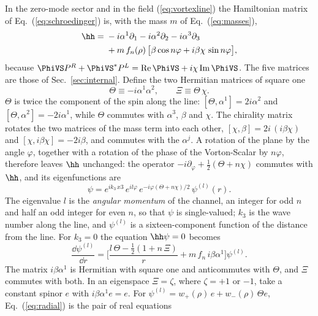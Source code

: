 In the zero-mode sector and in the field (\ref{eq:vortexline}) the Hamiltonian matrix of
Eq.~(\ref{eq:schroedinger}) is, with the mass $m$ of Eq.~(\ref{eq:masses}),
\begin{align}
\hh={}&-i\alpha^1\partial_1-i\alpha^2\partial_2-i\alpha^3\partial_3\nonumber\\
&+m\,f_n(\rho)\,\big[\beta\cos n\varphi+i\beta\chi\,\sin n\varphi\big],
\label{eq:hline}
\end{align}
because $\PhiVS P^{R}+\PhiVS^{*}P^{L}=\mathrm{Re}\,\PhiVS+i\chi\,\mathrm{Im}\,\PhiVS$. The five
matrices are those of Sec.~\ref{sec:internal}. Define the two Hermitian matrices of square one
\begin{equation}
\Theta\equiv-i\alpha^1\alpha^2,\qquad\Xi\equiv\Theta\,\chi .
\label{eq:ThetaXi}
\end{equation}
$\Theta$ is twice the component of the spin along the line: $[\Theta,\alpha^1]=2i\alpha^2$ and
$[\Theta,\alpha^2]=-2i\alpha^1$, while $\Theta$ commutes with $\alpha^3$, $\beta$ and $\chi$. The
chirality matrix rotates the two matrices of the mass term into each other,
$[\chi,\beta]=2i\,(i\beta\chi)$ and $[\chi,i\beta\chi]=-2i\beta$, and commutes with the $\alpha^j$.
A rotation of the plane by the angle $\varphi$, together with a rotation of the phase of the
Vorton-Scalar by $n\varphi$, therefore leaves $\hh$ unchanged: the operator
$-i\partial_\varphi+\tfrac12(\Theta+n\chi)$ commutes with $\hh$, and its eigenfunctions are
\begin{equation}
\psi=e^{ik_3\,x3}\,e^{il\varphi}\,e^{-i\varphi(\Theta+n\chi)/2}\,\psi^{(l)}(r).
\label{eq:channel}
\end{equation}
The eigenvalue $l$ is the \emph{angular momentum} of the channel, an integer for odd $n$ and half
an odd integer for even $n$, so that $\psi$ is single-valued; $k_3$ is the wave number along the
line, and $\psi^{(l)}$ is a sixteen-component function of the distance from the line. For $k_3=0$
the equation $\hh\psi=0$ becomes
\begin{equation}
\frac{\dd\psi^{(l)}}{\dd r}=\Big[\frac{l\,\Theta-\tfrac12(1+n\,\Xi)}{r}+m\,f_n\,i\beta\alpha^1\Big]\psi^{(l)} .
\label{eq:radial}
\end{equation}
The matrix $i\beta\alpha^1$ is Hermitian with square one and anticommutes with $\Theta$, and $\Xi$
commutes with both. In an eigenspace $\Xi=\zeta$, where $\zeta=+1$ or $-1$, take a constant spinor
$e$ with $i\beta\alpha^1e=e$. For $\psi^{(l)}=w_+(\rho)\,e+w_-(\rho)\,\Theta e$,
Eq.~(\ref{eq:radial}) is the pair of real equations
